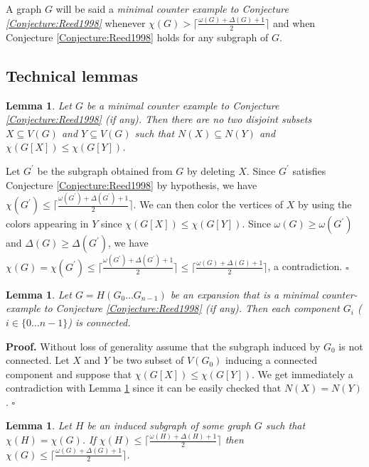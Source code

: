 \documentclass{amsart}
\newtheorem{lem}[thm]{Lemma}
\theoremstyle{definition}
\theoremstyle{remark}
\newenvironment{prf}{{\bf \noindent Proof. } }{\hfill$\square$\\}
\begin{document}
A graph $G$ will be said a {\em minimal counter example to Conjecture \ref{Conjecture:Reed1998}} whenever $\chi(G)>\lceil\frac{\omega(G)+\Delta(G)+1}{2}\rceil$ 
and when Conjecture \ref{Conjecture:Reed1998} holds for any subgraph of $G$.


\subsection{Technical lemmas}



\begin{lem}\label{Lemma:No_X_Y_minimum_cexemple}
Let $G$ be a minimal counter example to Conjecture \ref{Conjecture:Reed1998} (if any). Then there are no two disjoint subsets $X\subseteq V(G)$ and $Y \subseteq V(G)$  such that $N(X) \subseteq N(Y)$ 
and $\chi(G[X]) \leq \chi(G[Y])$.
\end{lem}


\begin{prf}
Let $G^{'}$ be the subgraph obtained from  $G$ by deleting $X$. Since $G^{'}$ satisfies Conjecture \ref{Conjecture:Reed1998} by hypothesis, we have
$\chi(G^{'}) \leq \lceil \frac{\omega(G^{'})+\Delta(G^{'})+1}{2}\rceil$. We can then color the vertices of $X$ by using the colors appearing in $Y$ since $\chi(G[X]) \leq \chi(G[Y])$.
Since $\omega(G) \geq \omega(G^{'})$ and $\Delta(G) \geq \Delta(G^{'})$, we have \\
$\chi(G) = \chi(G^{'}) \leq \lceil \frac{\omega(G^{'})+\Delta(G^{'})+1}{2}\rceil \leq  \lceil \frac{\omega(G)+ \Delta(G)+1}{2}\rceil$, a contradiction.
\end{prf}

\begin{lem}\label{Lemma:Connected_component_expansion_minimum_cexemple}
Let $G=H(G_0\ldots G_{n-1})$ be an  expansion that is a minimal counter-example to Conjecture \ref{Conjecture:Reed1998} (if any). Then each component $G_{i}$ ($i\in\{0\ldots n-1\}$) is connected.
\end{lem}
\begin{prf} Without loss of generality assume that the subgraph induced by $G_0$ is not connected. Let $X$ and $Y$ be two subset of $V(G_0)$ inducing a connected component and suppose that $\chi(G[X]) \leq \chi(G[Y])$. We get immediately a contradiction with Lemma \ref{Lemma:No_X_Y_minimum_cexemple} since it can be easily checked that $N(X)=N(Y)$.
\end{prf}


\begin{lem}\label{Lemma:ReedPourSousGrapheQuiAtteintLeChromaticNumber}
 Let $H$ be an induced subgraph of some graph $G$ such that  $\chi(H)=\chi(G)$.
If $\chi(H)\leq\lceil\frac{\omega(H)+\Delta(H)+1}{2}\rceil$ then $\chi(G)\leq\lceil\frac{\omega(G)+\Delta(G)+1}{2}\rceil$.
\end{lem}
\end{document}
